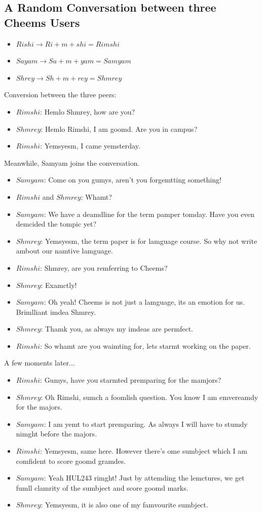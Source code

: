 \def\DevnagVersion{2.17}\documentclass{article}
\begin{document}
\subsection{A Random Conversation between three Cheems Users}
\begin{itemize}
    \item $Rishi \rightarrow Ri+m+shi = Rimshi$
    \item $Sayam \rightarrow Sa+m+yam = Samyam$
    \item $Shrey \rightarrow Sh+m+rey = Shmrey$
\end{itemize}
Conversion between the three peers:
\begin{itemize}[label={}]
    \item $Rimshi$: Hemlo Shmrey, how are you?
    \item $Shmrey$: Hemlo Rimshi, I am goomd. Are you in campus?
    \item $Rimshi$: Yemsyesm, I came yemsterday.
\end{itemize}
Meanwhile, Samyam joins the conversation.
\begin{itemize}[label={}]
    \item $Samyam$: Come on you gumys, aren't you forgemtting something!
    \item $Rimshi$ and $Shmrey$: Whamt?
    \item $Samyam$: We have a deamdline for the term pamper tomday. Have you even demcided the tompic yet?
    \item $Shmrey$: Yemsyesm, the term paper is for lamguage course. So why not write ambout our namtive lamguage.
    \item $Rimshi$: Shmrey, are you remferring to Cheems?
    \item $Shmrey$: Examctly!
    \item $Samyam$: Oh yeah! Cheems is not just a lamguage, its an emotion for us. Brimlliant imdea Shmrey.
    \item $Shmrey$: Thamk you, as always my imdeas are permfect.
    \item $Rimshi$: So whamt are you waimting for, lets starmt working on the paper.
\end{itemize}
A few moments later$\ldots$
\begin{itemize}[label={}]
    \item $Rimshi$: Gumys, have you starmted premparing for the mamjors?
    \item $Shmrey$: Oh Rimshi, sumch a foomlish question. You know I am emvereamdy for the majors.
    \item $Samyam$: I am yemt to start premparing. As always I will have to stumdy nimght before the majors.
    \item $Rimshi$: Yemsyesm, same here. However there's ome sumbject which I am comfident to score goomd gramdes.
    \item $Samyam$: Yeah HUL243 rimght! Just by attemding the lemctures, we get fumll clamrity of the sumbject and score goomd marks.
    \item $Shmrey$: Yemsyesm, it is also one of my famvourite sumbject.
\end{itemize}
\end{document}

